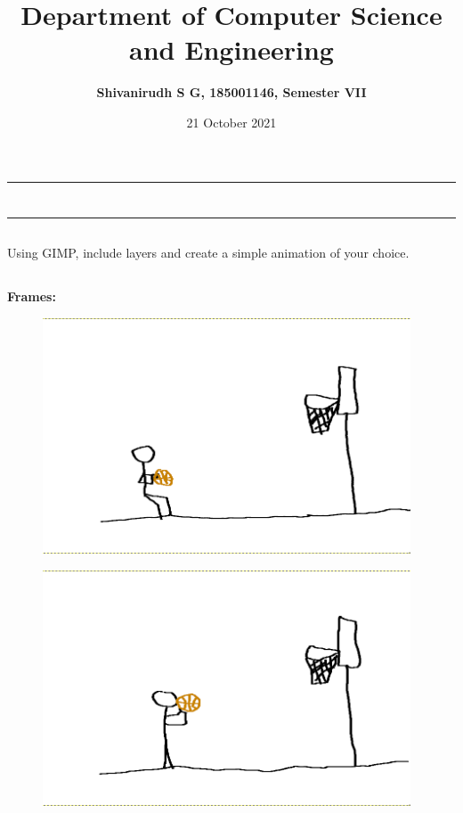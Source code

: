 \documentclass[9pt,letterpaper]{article}
\title{\textbf{Department of Computer Science and Engineering}}
\author{\textbf{Shivanirudh S G, 185001146, Semester VII }}
\date{21 October 2021}
\begin{document}
\maketitle
\hrule
\section*{}
\hrule 
\bigskip\bigskip

\subsection*{}

\subsection*{}
\begin{flushleft}
    Using GIMP, include layers and create a simple animation of your choice.
\end{flushleft}

\subsection*{}

\textbf{Frames:}\\
\begin{figure}[h]
    \centering
    \includegraphics[height=7cm]{Outputs/Frame1.png}
\end{figure}

\newpage
\begin{figure}[h]
    \centering
    \includegraphics[height=7cm]{Outputs/Frame2.png}
\end{figure}
\end{document}
